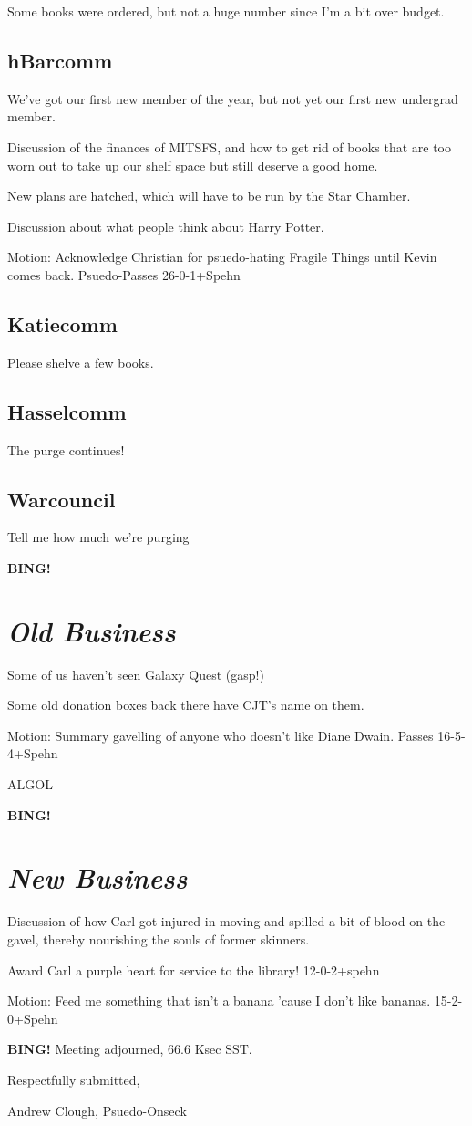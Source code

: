 \documentclass[10pt]{article}
\newcommand{\bing}{{\bf BING!} }
\newcommand{\goto}[1]{\bing \vskip 12pt \section*{{\em{#1}}}}
\begin{document}
Some books were ordered, but not a huge number since I'm a bit over budget.

\subsection*{hBarcomm}

We've got our first new member of the year, but not yet our first new undergrad member.

Discussion of the finances of MITSFS, and how to get rid of books that are too worn out to take up our shelf space but still deserve a good home.

New plans are hatched, which will have to be run by the Star Chamber.

Discussion about what people think about Harry Potter.

Motion:  Acknowledge Christian for psuedo-hating Fragile Things until Kevin comes back.  Psuedo-Passes  26-0-1+Spehn


\subsection*{Katiecomm}

Please shelve a few books.

\subsection*{Hasselcomm}

The purge continues!

\subsection*{Warcouncil}

Tell me how much we're purging

\goto{Old Business}

Some of us haven't seen Galaxy Quest (gasp!)

Some old donation boxes back there have CJT's name on them.

Motion:  Summary gavelling of anyone who doesn't like Diane Dwain.  Passes 16-5-4+Spehn

ALGOL

\goto{New Business}

Discussion of how Carl got injured in moving and spilled a bit of blood on the gavel, thereby nourishing the souls of former skinners.

Award Carl a purple heart for service to the library!  12-0-2+spehn

Motion:  Feed me something that isn't a banana 'cause I don't like bananas.  15-2-0+Spehn

\bing
\noindent
Meeting adjourned, 66.6 Ksec SST.

\vspace{18pt}

\centerline{Respectfully submitted,}
\centerline{Andrew Clough, Psuedo-Onseck}
\end{document}
